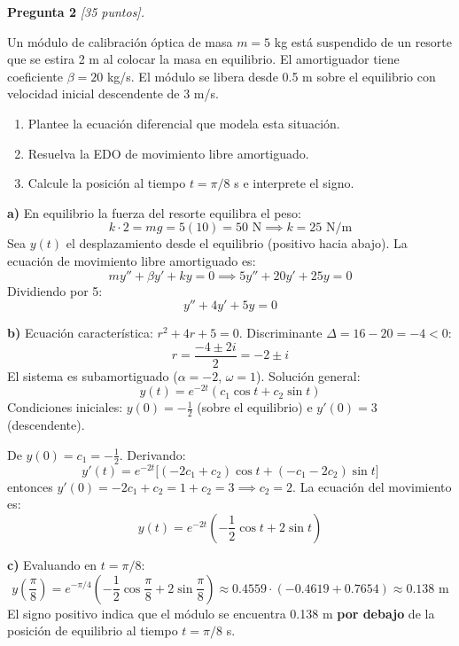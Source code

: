 \documentclass[12pt,letterpaper]{article}
\begin{document}
\bigskip

\textbf{Pregunta 2} \textit{[35 puntos].}

Un módulo de calibración óptica de masa $m=5$ kg está suspendido de un resorte que
se estira 2 m al colocar la masa en equilibrio. El amortiguador tiene coeficiente
$\beta=20$ kg/s. El módulo se libera desde 0.5 m sobre el equilibrio con velocidad
inicial descendente de 3 m/s.

\begin{enumerate}[label=\alph*)]
  \item Plantee la ecuación diferencial que modela esta situación.
  \item Resuelva la EDO de movimiento libre amortiguado.
  \item Calcule la posición al tiempo $t=\pi/8$ s e interprete el signo.
\end{enumerate}

\medskip

\textbf{a)} En equilibrio la fuerza del resorte equilibra el peso:
\[
  k\cdot 2 = mg = 5(10) = 50\text{ N} \implies k = 25\text{ N/m}
\]
Sea $y(t)$ el desplazamiento desde el equilibrio (positivo hacia abajo).
La ecuación de movimiento libre amortiguado es:
\[
  my'' + \beta y' + ky = 0 \implies 5y'' + 20y' + 25y = 0
\]
Dividiendo por 5:
\[
  y'' + 4y' + 5y = 0
\]

\textbf{b)} Ecuación característica: $r^2+4r+5=0$. Discriminante $\Delta = 16-20 = -4 < 0$:
\[
  r = \frac{-4 \pm 2i}{2} = -2 \pm i
\]
El sistema es subamortiguado ($\alpha=-2$, $\omega=1$). Solución general:
\[
  y(t) = e^{-2t}(c_1\cos t + c_2\sin t)
\]
Condiciones iniciales: $y(0)=-\tfrac{1}{2}$ (sobre el equilibrio) e $y'(0)=3$ (descendente).

De $y(0)=c_1 = -\tfrac{1}{2}$. Derivando:
\[
  y'(t) = e^{-2t}\bigl[(-2c_1+c_2)\cos t + (-c_1-2c_2)\sin t\bigr]
\]
entonces $y'(0) = -2c_1 + c_2 = 1 + c_2 = 3 \implies c_2 = 2$. La ecuación del movimiento es:
\[
  y(t) = e^{-2t}\!\left(-\frac{1}{2}\cos t + 2\sin t\right)
\]

\textbf{c)} Evaluando en $t=\pi/8$:
\[
  y\!\left(\frac{\pi}{8}\right)
  = e^{-\pi/4}\!\left(-\frac{1}{2}\cos\frac{\pi}{8}+2\sin\frac{\pi}{8}\right)
  \approx 0.4559\cdot(-0.4619 + 0.7654)
  \approx 0.138\text{ m}
\]
El signo positivo indica que el módulo se encuentra 0.138 m \textbf{por debajo}
de la posición de equilibrio al tiempo $t=\pi/8$ s.

\bigskip
\end{document}
